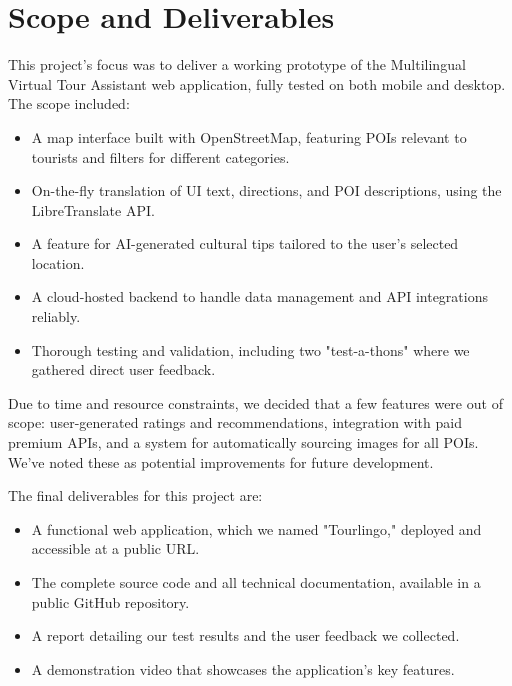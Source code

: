 \section{Scope and Deliverables}
This project's focus was to deliver a working prototype of the Multilingual Virtual Tour Assistant web application, fully tested on both mobile and desktop. The scope included:
\begin{itemize}
\item A map interface built with OpenStreetMap, featuring POIs relevant to tourists and filters for different categories.
\item On-the-fly translation of UI text, directions, and POI descriptions, using the LibreTranslate API.
\item A feature for AI-generated cultural tips tailored to the user’s selected location.
\item A cloud-hosted backend to handle data management and API integrations reliably.
\item Thorough testing and validation, including two "test-a-thons" where we gathered direct user feedback.
\end{itemize}

Due to time and resource constraints, we decided that a few features were out of scope: user-generated ratings and recommendations, integration with paid premium APIs, and a system for automatically sourcing images for all POIs. We've noted these as potential improvements for future development.

The final deliverables for this project are:
\begin{itemize}
    \item A functional web application, which we named "Tourlingo," deployed and accessible at a public URL.
    \item The complete source code and all technical documentation, available in a public GitHub repository.
    \item A report detailing our test results and the user feedback we collected.
    \item A demonstration video that showcases the application's key features.
\end{itemize}